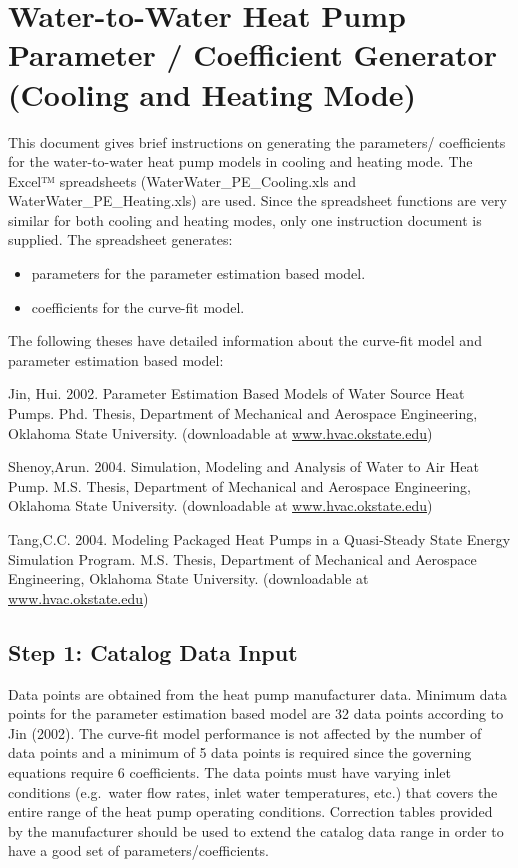 \section{Water-to-Water Heat Pump Parameter / Coefficient Generator (Cooling and Heating Mode)}\label{water-to-water-heat-pump-parameter-coefficient-generator-cooling-and-heating-mode}

This document gives brief instructions on generating the parameters/ coefficients for the water-to-water heat pump models in cooling and heating mode. The Excel™ spreadsheets (WaterWater\_PE\_Cooling.xls and WaterWater\_PE\_Heating.xls) are used. Since the spreadsheet functions are very similar for both cooling and heating modes, only one instruction document is supplied. The spreadsheet generates:

\begin{itemize}
\item
  parameters for the parameter estimation based model.
\item
  coefficients for the curve-fit model.
\end{itemize}

The following theses have detailed information about the curve-fit model and parameter estimation based model:

Jin, Hui. 2002. Parameter Estimation Based Models of Water Source Heat Pumps. Phd. Thesis, Department of Mechanical and Aerospace Engineering, Oklahoma State University. (downloadable at \href{http://www.hvac.okstate.edu}{www.hvac.okstate.edu})

Shenoy,Arun. 2004. Simulation, Modeling and Analysis of Water to Air Heat Pump. M.S. Thesis, Department of Mechanical and Aerospace Engineering, Oklahoma State University. (downloadable at \href{http://www.hvac.okstate.edu}{www.hvac.okstate.edu})

Tang,C.C. 2004. Modeling Packaged Heat Pumps in a Quasi-Steady State Energy Simulation Program. M.S. Thesis, Department of Mechanical and Aerospace Engineering, Oklahoma State University. (downloadable at \href{http://www.hvac.okstate.edu}{www.hvac.okstate.edu})

\subsection{Step 1: Catalog Data Input}\label{step-1-catalog-data-input-001}

Data points are obtained from the heat pump manufacturer data. Minimum data points for the parameter estimation based model are 32 data points according to Jin (2002). The curve-fit model performance is not affected by the number of data points and a minimum of 5 data points is required since the governing equations require 6 coefficients. The data points must have varying inlet conditions (e.g.~water flow rates, inlet water temperatures, etc.) that covers the entire range of the heat pump operating conditions. Correction tables provided by the manufacturer should be used to extend the catalog data range in order to have a good set of parameters/coefficients.

